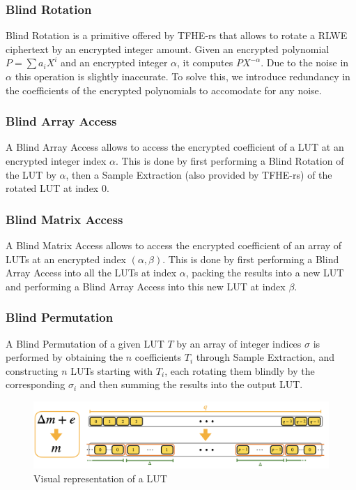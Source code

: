 \documentclass{article}
\begin{document}
\subsubsection*{Blind Rotation}

Blind Rotation is a primitive offered by TFHE-rs that allows to rotate a RLWE ciphertext by an encrypted integer amount. Given an encrypted polynomial $P = \sum{a_i X^i}$ and an encrypted integer $\alpha$, it computes $P X^{-\alpha}$. Due to the noise in $\alpha$ this operation is slightly inaccurate. To solve this, we introduce redundancy in the coefficients of the encrypted polynomials to accomodate for any noise.

\subsubsection*{Blind Array Access}

A Blind Array Access allows to access the encrypted coefficient of a LUT at an encrypted integer index $\alpha$. This is done by first performing a Blind Rotation of the LUT by $\alpha$, then a Sample Extraction (also provided by TFHE-rs) of the rotated LUT at index 0.

\subsubsection*{Blind Matrix Access}

A Blind Matrix Access allows to access the encrypted coefficient of an array of LUTs at an encrypted index $(\alpha, \beta)$. This is done by first performing a Blind Array Access into all the LUTs at index $\alpha$, packing the results into a new LUT and performing a Blind Array Access into this new LUT at index $\beta$.

\subsubsection*{Blind Permutation}

A Blind Permutation of a given LUT $T$ by an array of integer indices $\sigma$ is performed by obtaining the $n$ coefficients $T_i$ through Sample Extraction, and constructing $n$ LUTs starting with $T_i$, each rotating them blindly by the corresponding $\sigma_i$ and then summing the results into the output LUT.\@

\begin{figure}[h]
    \centering
    \includegraphics[scale=0.35]{lut}
    \caption{Visual representation of a LUT\cite{LUT}}
\end{figure}
\end{document}

